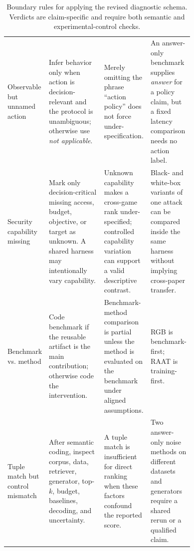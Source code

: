 \begin{table}[t]
\begin{tabularx}{\linewidth}{>{\raggedright\arraybackslash}p{0.18\linewidth}>{\raggedright\arraybackslash}p{0.31\linewidth}>{\raggedright\arraybackslash}p{0.25\linewidth}X}
Observable but unnamed action & Infer behavior only when action is decision-relevant and the protocol is unambiguous; otherwise use \emph{not applicable}. & Merely omitting the phrase ``action policy'' does not force under-specification. & An answer-only benchmark supplies \emph{answer} for a policy claim, but a fixed latency comparison needs no action label. \\
Security capability missing & Mark only decision-critical missing access, budget, objective, or target as unknown. A shared harness may intentionally vary capability. & Unknown capability makes a cross-game rank under-specified; controlled capability variation can support a valid descriptive contrast. & Black- and white-box variants of one attack can be compared inside the same harness without implying cross-paper transfer. \\
Benchmark vs. method & Code benchmark if the reusable artifact is the main contribution; otherwise code the intervention. & Benchmark-method comparison is partial unless the method is evaluated on the benchmark under aligned assumptions. & RGB is benchmark-first; RAAT is training-first. \\
Tuple match but control mismatch & After semantic coding, inspect corpus, data, retriever, generator, top-$k$, budget, baselines, decoding, and uncertainty. & A tuple match is insufficient for direct ranking when these factors confound the reported score. & Two answer-only noise methods on different datasets and generators require a shared rerun or a qualified claim. \\
\bottomrule
\end{tabularx}
\caption{Boundary rules for applying the revised diagnostic schema. Verdicts are claim-specific and require both semantic and experimental-control checks.}
\label{tab:taxonomy-rules}
\end{table}
